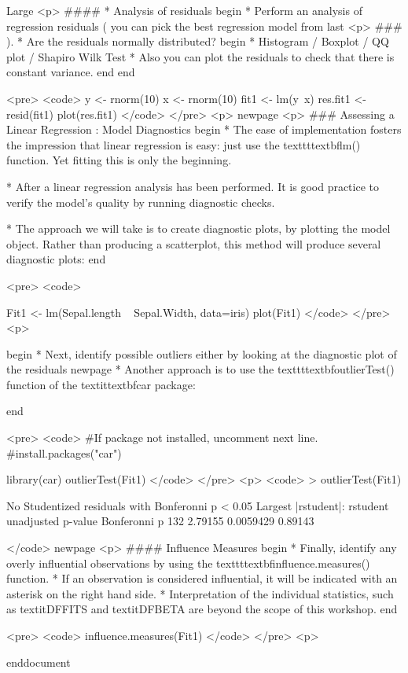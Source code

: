 
Large
		<p>
####        * {Analysis of residuals}
		begin{ }
		        * 	Perform an analysis of regression residuals ( you can pick the best regression model from last <p>
### ).
		        * 	Are the residuals normally distributed?
		begin{ }
			         * Histogram /  Boxplot / QQ plot / Shapiro Wilk Test
			         * Also you can plot the residuals to check that there is constant variance.
		end{ }	
		end{ }
	
	<pre>
		<code>
		y <- rnorm(10)
		x <- rnorm(10)
		fit1 <- lm(y~x)
		res.fit1 <-  resid(fit1)
		plot(res.fit1)
		</code>
     </pre>
<p>		
newpage
<p>
### {Assessing a Linear Regression :  Model Diagnostics}
begin{ }
         * The ease of implementation fosters the impression that linear regression is easy: just use the texttt{textbf{lm()}} function. Yet fitting
this is only the beginning.

         * After a linear regression analysis has been performed. It is good practice to verify the model’s quality
by running diagnostic checks.

         * The approach we will take is to create diagnostic plots, by plotting the model object. Rather than producing a scatterplot, this method will produce several diagnostic plots:
end{ }


<pre>
<code>

Fit1 <- lm(Sepal.length ~ Sepal.Width, data=iris)
plot(Fit1)
</code> 
</pre>
<p>

begin{ }
         * Next, identify possible outliers either by looking at the diagnostic plot of the residuals
newpage
         * Another approach is to use the texttt{textbf{outlierTest()}} function of the textit{textbf{car}} package:

end{ }

<pre>
<code>
#If package not installed, uncomment next line.
#install.packages("car")

library(car)
outlierTest(Fit1)
</code> 
</pre>
<p>
<code>
> outlierTest(Fit1)

No Studentized residuals with Bonferonni p < 0.05
Largest |rstudent|:
    rstudent unadjusted p-value Bonferonni p
132  2.79155          0.0059429      0.89143

</code>
newpage
<p>
#### {Influence Measures}
begin{ }
         * Finally, identify any overly influential observations by using the texttt{textbf{influence.measures()}} 
function.
         * If an observation is considered influential, it will be indicated with an asterisk on the right hand side.          * Interpretation of the individual statistics, such as textit{DFFITS} and textit{DFBETA} are beyond the scope of this workshop.
end{ }


<pre>
<code>
influence.measures(Fit1)
</code> 
</pre>
<p>

end{document}

